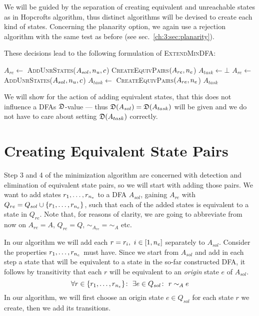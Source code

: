 We will be guided by the separation of creating equivalent and unreachable states as in Hopcrofts algorithm, thus distinct algorithms will be devised to create each kind of states. Concerning the planarity option, we again use a rejection algorithm with the same test as before (see sec.~\ref{ch:3:sec:planarity}).

These decisions lead to the following formulation of \textsc{ExtendMinDFA}:
\newpage
\vspace{0.2cm}
\begin{spacing}{1}
	\begin{algorithmic}[1]
			\State $A_{re} \gets$ \textsc{AddUnrStates}($A_{sol}, {n_u}, c$)
			\State \Return \textsc{CreateEquivPairs}$(A_{re}, {n_e}$)
		\Else
			\State $A_{task} \gets \bot$
				\State $A_{re} \gets$ \textsc{AddUnrStates}($A_{sol}, {n_u}, c$)
				\State $A_{task} \gets$ \textsc{CreateEquivPairs}$(A_{re}, {n_e}$)
			\EndWhile
			\State \Return $A_{task}$
		\EndIf
		\EndFunction
	\end{algorithmic}
\end{spacing}
\vspace{0.2cm}
\noindent We will show for the action of adding equivalent states, that this does not influence a DFAs $\mathfrak{D}$-value --- thus $\mathfrak{D}(A_{sol}) = \mathfrak{D}(A_{task})$ will be given and we do not have to care about setting $\mathfrak{D}(A_{task})$ correctly.

\section{Creating Equivalent State Pairs}

Step 3 and 4 of the minimization algorithm are concerned with detection and elimination of equivalent state pairs, so we will start with adding those pairs. We want to add states $r_1,\ldots,r_{n_e}$ to a DFA $A_{sol}$, gaining $A_{re}$ with $Q_{re} = Q_{sol} \cup \{r_1,\ldots,r_{n_e}\}$, such that each of the added states is equivalent to a state in $Q_{re}$. Note that, for reasons of clarity, we are going to abbreviate from now on $A_{re} = A$, $Q_{re} = Q$, $\sim_{A_{re}} = \sim_A$ etc.

In our algorithm we will add each $r = r_i,\ i\in[1,{n_e}]$ separately to $A_{sol}$. Consider the properties $r_1,\ldots,r_{n_e}$ must have. Since we start from $A_{sol}$ and add in each step a state that will be equivalent to a state in the so-far constructed DFA, it follows by transitivity that each $r$ will be equivalent to an \emph{origin} state $e$ of $A_{sol}$.
\[
	\forall r \in \{r_1,\ldots,r_{{n_e}}\} \colon\ \exists e \in Q_{sol}\colon\ r \sim_A e
\]
In our algorithm, we will first choose an origin state $e\in Q_{sol}$ for each state $r$ we create, then we add its transitions.

